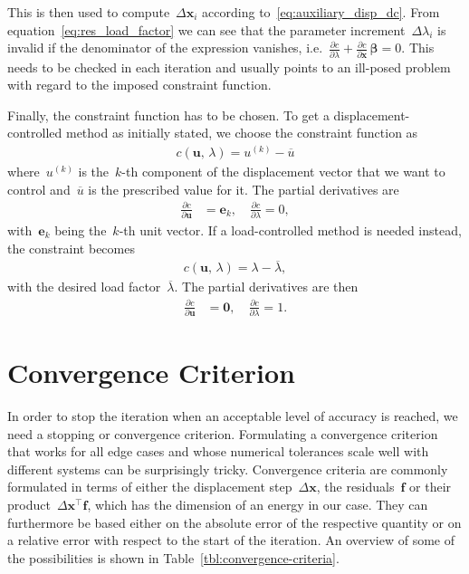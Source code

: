 This is then used to compute~$\Delta\boldsymbol{x}_{i}$ according to~\eqref{eq:auxiliary_disp_dc}.
From equation~\eqref{eq:res_load_factor} we can see that the parameter increment~$\Delta \lambda_{i}$ is invalid if the denominator of the expression vanishes, i.e.~$\frac{\partial c}{\partial \lambda} + \frac{\partial c}{\partial \boldsymbol{x}}\,\boldsymbol{\beta} = 0$.
This needs to be checked in each iteration and usually points to an ill-posed problem with regard to the imposed constraint function.

Finally, the constraint function has to be chosen.
To get a displacement-controlled method as initially stated, we choose the constraint function as
%
\begin{align}
c(\boldsymbol{u},\,\lambda) = u^{(k)} - \overline{u}
\end{align}
%
where~$u^{(k)}$ is the~$k$-th component of the displacement vector that we want to control and~$\overline{u}$ is the prescribed value for it.
The partial derivatives are
%
\begin{align*}
\frac{\partial c}{\partial \boldsymbol{u}} &= \boldsymbol{e}_k,\quad
\frac{\partial c}{\partial \lambda} = 0,
\end{align*}
%
with~$\boldsymbol{e}_k$ being the~$k$-th unit vector.
If a load-controlled method is needed instead, the constraint becomes
%
\begin{align}
c(\boldsymbol{u},\,\lambda) = \lambda - \overline{\lambda},
\end{align}
%
with the desired load factor~$\overline{\lambda}$.
The partial derivatives are then
%
\begin{align*}
\frac{\partial c}{\partial \boldsymbol{u}} &= \boldsymbol{0},\quad
\frac{\partial c}{\partial \lambda} = 1.
\end{align*}

\section{Convergence Criterion}

In order to stop the iteration when an acceptable level of accuracy is reached, we need a stopping or convergence criterion.
Formulating a convergence criterion that works for all edge cases and whose numerical tolerances scale well with different systems can be surprisingly tricky.
Convergence criteria are commonly formulated in terms of either the displacement step~$\Delta\boldsymbol{x}$, the residuals~$\boldsymbol{f}$ or their product~$\Delta\boldsymbol{x}^\intercal\boldsymbol{f}$, which has the dimension of an energy in our case.
They can furthermore be based either on the absolute error of the respective quantity or on a relative error with respect to the start of the iteration.
An overview of some of the possibilities is shown in Table~\ref{tbl:convergence-criteria}.

